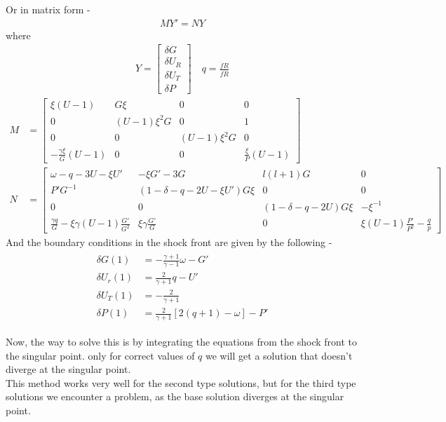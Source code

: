 \documentclass{article}
\begin{document}
Or in matrix form -
\begin{align}
    MY'=NY
\end{align}
where 
\begin{align}
    Y=\begin{bmatrix}\delta G\\
        \delta U_{R}\\
        \delta U_{T}\\
        \delta P
        \end{bmatrix}
        \quad q=\frac{\dot{f}R}{f\dot{R}}
\end{align}
\begin{align}
    M&=\begin{bmatrix}\xi\left(U-1\right) & G\xi & 0 & 0\\
        0 & \left(U-1\right)\xi^{2}G & 0 & 1\\
        0 & 0 & \left(U-1\right)\xi^{2}G & 0\\
        -\frac{\gamma\xi}{G}\left(U-1\right) & 0 & 0 & \frac{\xi}{P}\left(U-1\right)
        \end{bmatrix}\\
    N&=\begin{bmatrix}\omega-q-3U-\xi U' & -\xi G'-3G & l\left(l+1\right)G & 0\\
        P'G^{-1} & \left(1-\delta-q-2U-\xi U'\right)G\xi & 0 & 0\\
        0 & 0 & \left(1-\delta-q-2U\right)G\xi & -\xi^{-1}\\
        \frac{\gamma q}{G}-\xi\gamma\left(U-1\right)\frac{G'}{G^{2}} & \xi\gamma\frac{G'}{G} & 0 & \xi\left(U-1\right)\frac{P'}{P^{2}}-\frac{q}{p}
        \end{bmatrix}
\end{align}
And the boundary conditions in the shock front are given by the following -
\begin{align}
    \begin{split}
        \delta G\left(1\right)&=-\frac{\gamma+1}{\gamma-1}\omega-G'\\
        \delta U_{r}\left(1\right)&=\frac{2}{\gamma+1}q-U'\\
        \delta U_{T}\left(1\right)&=-\frac{2}{\gamma+1}\\
        \delta P\left(1\right)&=\frac{2}{\gamma+1}\left[2\left(q+1\right)-\omega\right]-P'
    \end{split}
\end{align}

Now, the way to solve this is by integrating the equations from the shock front to the singular point. only for correct values of $q$ we will get a solution that doesn't diverge at the singular point.\\
This method works very well for the second type solutions, but for the third type solutions we encounter a problem, as the base solution diverges at the singular point.
\end{document}
